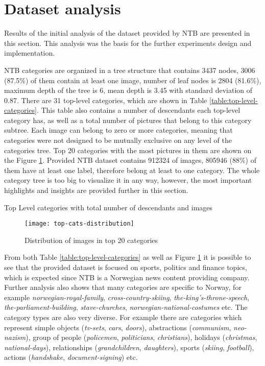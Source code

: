 \section{Dataset analysis}
\label{sec:dataset-analysis}
Results of the initial analysis of the dataset provided by NTB are presented in this section. This analysis was the basis for the further experiments design and implementation.

NTB categories are organized in a tree structure that contains 3437 nodes, 3006 (87.5\%) of them contain at least one image, number of leaf nodes is 2804 (81.6\%), maximum depth of the tree is 6, mean depth is 3.45 with standard deviation of 0.87. There are 31 top-level categories, which are shown in Table \ref{table:top-level-categories}. This table also contains a number of descendants each top-level category has, as well as a total number of pictures that belong to this category subtree. Each image can belong to zero or more categories, meaning that categories were not designed to be mutually exclusive on any level of the categories tree. Top 20 categories with the most pictures in them are shown on the Figure \ref{fig:top-cats-distribution}.  Provided NTB dataset contains 912324 of images, 805946 (88\%) of them have at least one label, therefore belong at least to one category. The whole category tree is too big to visualize it in any way, however, the most important highlights and insights are provided further in this section.

\begin{table}[h!]
    \centering
    \caption{Top Level categories with total number of descendants and images}
    \label{table:top-level-categories}
\end{table}

\begin{figure}[h!]
    \centering
    \texttt{[image: top-cats-distribution]}
    \caption{Distribution of images in top 20 categories}
    \label{fig:top-cats-distribution}
\end{figure}

From both Table \ref{table:top-level-categories} as well as Figure \ref{fig:top-cats-distribution} it is possible to see that the provided dataset is focused on sports, politics and finance topics, which is expected since NTB is a Norwegian news content providing company. Further analysis also shows that many categories are specific to Norway, for example \textit{norwegian-royal-family}, \textit{cross-country-skiing}, \textit{the-king's-throne-speech}, \textit{the-parliament-building}, \textit{stave-churches}, \textit{norwegian-national-costumes} etc. The category types are also very diverse. For example there are categories which represent simple objects (\textit{tv-sets}, \textit{cars}, \textit{doors}), abstractions (\textit{communism}, \textit{neo-nazism}), group of people (\textit{policemen}, \textit{politicians}, \textit{christians}), holidays (\textit{christmas}, \textit{national-days}), relationships (\textit{grandchildren}, \textit{daughters}), sports (\textit{skiing}, \textit{football}), actions (\textit{handshake}, \textit{document-signing}) etc.

